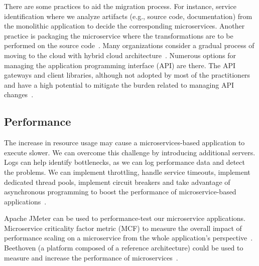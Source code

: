 There are some practices to aid the migration process.
For instance, service identification where we analyze artifacts (e.g., source code, documentation) from the monolithic application to decide the corresponding microservices.
%
Another practice is packaging the microservice where the transformations are to be performed on the source code~\cite{selmadji2020}.
%
Many organizations consider a gradual process of moving to the cloud with hybrid cloud architecture~\cite{Mikail2020}.
Numerous options for managing the application programming interface (API) are there. The API gateways and client libraries, although not adopted by most of the practitioners and have a high potential to mitigate the burden related to managing API changes~\cite{wang2020}.


\subsection{Performance}%
The increase in resource usage may cause a microservices-based application to execute slower. We can overcome this challenge by introducing additional servers. Logs can help identify bottlenecks, as we can log performance data and detect the problems. %
We can implement throttling, handle service timeouts, implement dedicated thread pools, implement circuit breakers and take advantage of asynchronous programming to boost the performance of microservice-based applications~\cite{Ghebremicael2017, Johansson2019, Zhihui2020}.

Apache JMeter can be used to performance-test our microservice applications. Microservice criticality factor metric (MCF) to measure the overall impact of performance scaling on a microservice from the whole application's perspective~\cite{Hou2019}. Beethoven (a platform composed of a reference architecture) could be used to measure and increase the performance of microservices~\cite{Monteiro2020}. 


